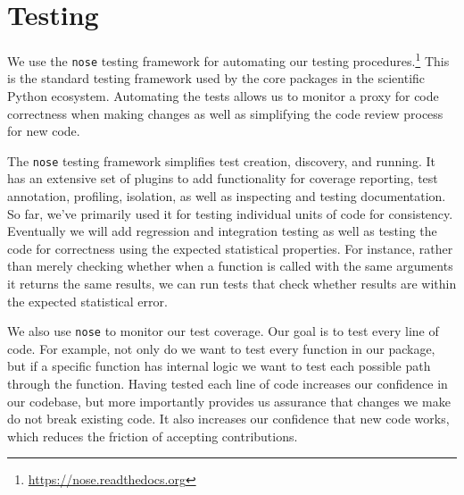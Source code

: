 \section{\label{sec:test}Testing}

We use the \texttt{nose} testing framework for automating our testing
procedures.\footnote{\url{https://nose.readthedocs.org}}  This is the standard
testing framework used by the core packages in the scientific Python ecosystem.
Automating the tests allows us to monitor a proxy for code correctness when
making changes as well as simplifying the code review process for new code. 

The \texttt{nose} testing framework simplifies test creation, discovery,
and running. It has an extensive set of plugins to add functionality
for coverage reporting, test annotation, profiling, isolation, as well
as inspecting and testing documentation.
So far, we've primarily used it for testing individual units of code for
consistency.  Eventually we will add regression and integration testing as well
as testing the code for correctness using the expected statistical properties.
For instance, rather than merely checking whether when a function is called
with the same arguments it returns the same results, we can run tests that
check whether results are within the expected statistical error.


%
%


We also use \texttt{nose} to monitor our test coverage.  Our goal is to
test every line of code.  For example, not only do we want to test every
function in our package, but if a specific function has internal logic
we want to test each possible path through the function.  Having tested
each line of code increases our confidence in our codebase, but more
importantly provides us assurance that changes we make do not break
existing code.  It also increases our confidence that new code works,
which reduces the friction of accepting contributions.

